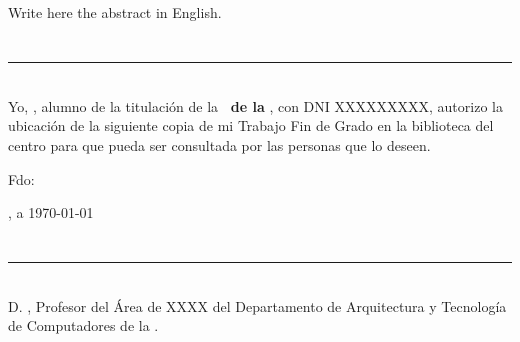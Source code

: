 {\cleardoublepage

\thispagestyle{empty}

\begin{center}
{\large\bfseries \tituloEng}\\
\end{center}
\begin{center}
\autor\\
\end{center}

\\

\vspace{0.7cm}
\\

Write here the abstract in English.

\chapter*{}
\thispagestyle{empty}

\noindent\rule[-1ex]{\textwidth}{2pt}\\[4.5ex]

Yo, \textbf{\autor}, alumno de la titulación \titulacion de la \textbf{\escuela\ de la \universidad}, con DNI XXXXXXXXX, 
autorizo la ubicación de la siguiente copia de mi Trabajo Fin de Grado en la biblioteca del centro para que pueda ser
consultada por las personas que lo deseen.

\vspace{6cm}

\noindent Fdo: \autor

\vspace{2cm}

\begin{flushright}
\ciudad, a \today
\end{flushright}

\chapter*{}
\thispagestyle{empty}

\noindent\rule[-1ex]{\textwidth}{2pt}\\[4.5ex]

D. \textbf{\tutor}, Profesor del Área de XXXX del Departamento de Arquitectura y Tecnología de Computadores de la \universidad.

}
